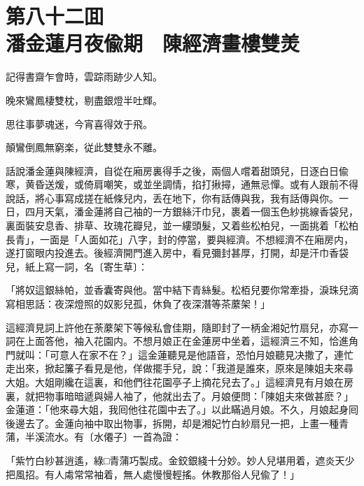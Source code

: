 
\chapter*{第八十二囬　\\潘金蓮月夜偸期　陳經濟畫樓雙羙}


\begin{myquote}
記得書齋乍會時，雲踪雨跡少人知。

晚來鸞鳳棲雙枕，剔盡銀燈半吐輝。

思往事夢魂迷，今宵喜得效于飛。

顛鸞倒鳳無窮楽，従此雙雙永不離。
\end{myquote}

話說潘金蓮與陳經濟，自從在廂房裏得手之後，兩個人嚐着甜頭兒，日逐白日偸寒，黄昏送煖，或倚肩嘲笑，或並坐調情，掐打揪撏，通無忌憚。或有人跟前不得說話，將心事寫成搓在紙條兒内，丢在地下，你有話傳與我，我有話傳與你。一日，四月天氣，潘金蓮將自己袖的一方銀絲汗巾兒，裹着一個玉色紗挑線香袋兒，裏面裝安息香、排草、玫瑰花瓣兒，並一縷頭髮，又着些松柏兒，一面挑着「松柏長青」，一面是「人面如花」八字，封的停當，要與經濟。不想經濟不在廂房内，遂打窗眼内投進去。後經濟開門進入房中，看見彌封甚厚，打開，却是汗巾香袋兒，紙上寫一詞，名〔寄生草〕：

\begin{myquote}
「將奴這銀絲帕，並香囊寄與他。當中結下青絲髮。松栢兒要你常牽掛，淚珠兒滴寫相思話：夜深燈照的奴影兒孤，休負了夜深潛等茶䕷架！」
\end{myquote}

這經濟見詞上許他在荼䕷架下等候私會佳期，隨即封了一柄金湘妃竹扇兒，亦寫一詞在上面答他，袖入花園内。不想月娘正在金蓮房中坐着，這經濟三不知，恰進角門就叫：「可意人在家不在？」這金蓮聽見是他語音，恐怕月娘聽見决撒了，連忙走出來，掀起簾子看見是他，佯做擺手兒，說：「我道是誰來，原來是陳姐夫來尋大姐。大姐剛纔在這裏，和他們往花園亭子上摘花兒去了。」這經濟見有月娘在房裏，就把物事暗暗遞與婦人袖了，他就出去了。月娘便問：「陳姐夫來做甚麽？」金蓮道：「他來尋大姐，我囘他往花園中去了。」以此瞞過月娘。不久，月娘起身囘後邊去了。金蓮向袖中取出物事，拆開，却是湘妃竹白紗扇兒一把，上畫一種青蒲，半溪流水。有〔水僊子〕一首為證：

\begin{myquote}
「紫竹白紗甚逍遙，綠□青蒲巧製成。金鉸銀綫十分妙。妙人兒堪用着，遮炎天少把風招。有人䖏常常袖着，無人處慢慢輕搖。休教那俗人兒偸了！」
\end{myquote}

